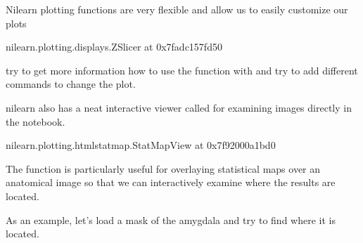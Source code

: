 \documentclass[letterpaper,10pt,english]{sphinxmanual}
\begin{document}
\noindent{}

Nilearn plotting functions are very flexible and allow us to easily customize our plots

\begin{sphinxVerbatim}[commandchars=\\\{\}]
  
\end{sphinxVerbatim}

\begin{sphinxVerbatim}[commandchars=\\\{\}]
\PYGZlt{}nilearn.plotting.displays.ZSlicer at 0x7fadc157fd50\PYGZgt{}
\end{sphinxVerbatim}

\noindent{}

try to get more information how to use the function with  and try to add different commands to change the plot.

nilearn also has a neat interactive viewer called  for examining images directly in the notebook.

\begin{sphinxVerbatim}[commandchars=\\\{\}]
\end{sphinxVerbatim}

\begin{sphinxVerbatim}[commandchars=\\\{\}]
\PYGZlt{}nilearn.plotting.html\PYGZus{}stat\PYGZus{}map.StatMapView at 0x7f92000a1bd0\PYGZgt{}
\end{sphinxVerbatim}

The  function is particularly useful for overlaying statistical maps over an anatomical image so that we can interactively examine where the results are located.

As an example, let’s load a mask of the amygdala and try to find where it is located.

\begin{sphinxVerbatim}[commandchars=\\\{\}]
     
 
\end{sphinxVerbatim}
\end{document}
